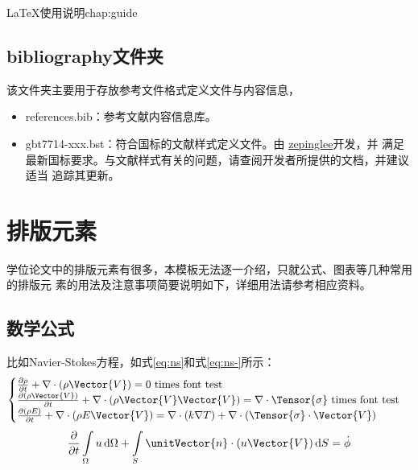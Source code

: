 \begin{cuzchapter}{\LaTeX{}使用说明}{chap:guide}
    \subsection{bibliography文件夹}\label{sub:bibliography}

    该文件夹主要用于存放参考文件格式定义文件与内容信息，

    \begin{itemize}
        \item references.bib：参考文献内容信息库。
        \item gbt7714-xxx.bst：符合国标的文献样式定义文件。由
              \href{https://github.com/zepinglee/gbt7714-bibtex-style}{zepinglee}开发，并
              满足最新国标要求。与文献样式有关的问题，请查阅开发者所提供的文档，并建议适当
              追踪其更新。
    \end{itemize}

    \section{排版元素}\label{sec:elements}

    学位论文中的排版元素有很多，本模板无法逐一介绍，只就公式、图表等几种常用的排版元
    素的用法及注意事项简要说明如下，详细用法请参考相应资料。

    \subsection{数学公式}\label{sub:equations}

    比如Navier-Stokes方程，如式\eqref{eq:ns}和式\eqref{eq:ns-}所示：
    \begin{equation}
        \label{eq:ns}
        \begin{cases}
            \frac{\partial \rho}{\partial t} + \nabla\cdot(\rho\Vector{V}) = 0 \ \mathrm{times\ font\ test}                                            \\
            \frac{\partial (\rho\Vector{V})}{\partial t} + \nabla\cdot(\rho\Vector{V}\Vector{V}) = \nabla\cdot\Tensor{\sigma} \ \text{times font test} \\
            \frac{\partial (\rho E)}{\partial t} + \nabla\cdot(\rho E\Vector{V}) = \nabla\cdot(k\nabla T) + \nabla\cdot(\Tensor{\sigma}\cdot\Vector{V})
        \end{cases}
    \end{equation}
    \begin{equation}
        \label{eq:ns-}
        \frac{\partial }{\partial t}\int\limits_{\Omega} u \, \mathrm{d}\Omega + \int\limits_{S} \unitVector{n}\cdot(u\Vector{V}) \, \mathrm{d}S = \dot{\phi}
    \end{equation}


\end{cuzchapter}
